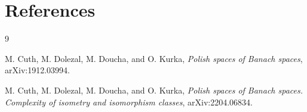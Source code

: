 \documentclass[11pt]{article}
\begin{document}
\section*{References}

\begin{thebibliography}{9}

M. Cuth, M. Dolezal, M. Doucha, and O. Kurka,
\emph{Polish spaces of Banach spaces},
arXiv:1912.03994.

M. Cuth, M. Dolezal, M. Doucha, and O. Kurka,
\emph{Polish spaces of Banach spaces. Complexity of isometry and isomorphism classes},
arXiv:2204.06834.

\end{thebibliography}
\end{document}
